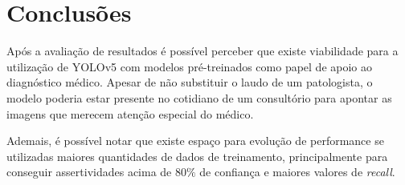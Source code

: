 \documentclass[12pt]{article}
\begin{document}
\FloatBarrier

\section{Conclusões}

Após a avaliação de resultados é possível perceber que existe viabilidade para a utilização de YOLOv5 com modelos pré-treinados como papel de apoio ao diagnóstico médico. Apesar de não substituir o laudo de um patologista, o modelo poderia estar presente no cotidiano de um consultório para apontar as imagens que merecem atenção especial do médico.

Ademais, é possível notar que existe espaço para evolução de performance se utilizadas maiores quantidades de dados de treinamento, principalmente para conseguir assertividades acima de $80\%$ de confiança e maiores valores de {\it recall}.



\end{document}

